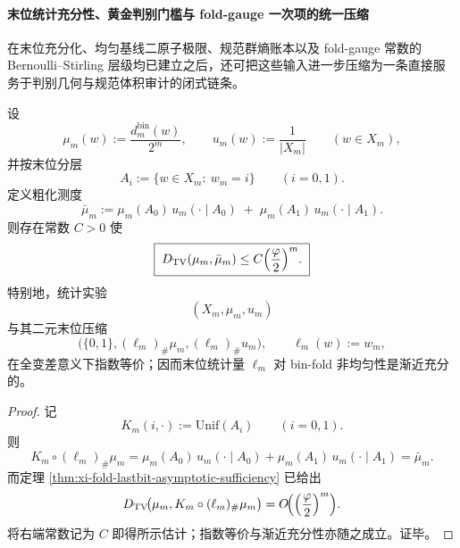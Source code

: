 \paragraph{末位统计充分性、黄金判别门槛与 fold-gauge 一次项的统一压缩}
在末位充分化、均匀基线二原子极限、规范群熵账本以及 fold-gauge 常数的 Bernoulli--Stirling 层级均已建立之后，还可把这些输入进一步压缩为一条直接服务于判别几何与规范体积审计的闭式链条。

\begin{theorem}\label{thm:xi-fold-lastbit-statistical-sufficiency-collapse}
设
\[
\mu_m(w):=\frac{d_m^{\mathrm{bin}}(w)}{2^m},
\qquad
u_m(w):=\frac{1}{|X_m|}
\qquad (w\in X_m),
\]
并按末位分层
\[
A_i:=\{w\in X_m:\ w_m=i\}
\qquad (i=0,1).
\]
定义粗化测度
\[
\bar\mu_m
:=
\mu_m(A_0)\,u_m(\cdot\mid A_0)
\;+\;
\mu_m(A_1)\,u_m(\cdot\mid A_1).
\]
则存在常数 \(C>0\) 使
\[
\boxed{\;
D_{\mathrm{TV}}(\mu_m,\bar\mu_m)
\le
C\Bigl(\frac{\varphi}{2}\Bigr)^m.\;}
\]
特别地，统计实验
\[
(X_m,\mu_m,u_m)
\]
与其二元末位压缩
\[
\bigl(\{0,1\},(\ell_m)_\#\mu_m,(\ell_m)_\#u_m\bigr),
\qquad
\ell_m(w):=w_m,
\]
在全变差意义下指数等价；因而末位统计量 \(\ell_m\) 对 bin-fold 非均匀性是渐近充分的。
\end{theorem}
\begin{proof}
记
\[
K_m(i,\cdot):=\mathrm{Unif}(A_i)
\qquad (i=0,1).
\]
则
\[
K_m\circ (\ell_m)_\#\mu_m
=
\mu_m(A_0)\,u_m(\cdot\mid A_0)
+\mu_m(A_1)\,u_m(\cdot\mid A_1)
=
\bar\mu_m.
\]
而定理 \ref{thm:xi-fold-lastbit-asymptotic-sufficiency} 已给出
\[
D_{\mathrm{TV}}\!\bigl(\mu_m,K_m\circ(\ell_m)_\#\mu_m\bigr)
=
O\!\Bigl(\Bigl(\frac{\varphi}{2}\Bigr)^m\Bigr).
\]
将右端常数记为 \(C\) 即得所示估计；指数等价与渐近充分性亦随之成立。证毕。
\end{proof}

